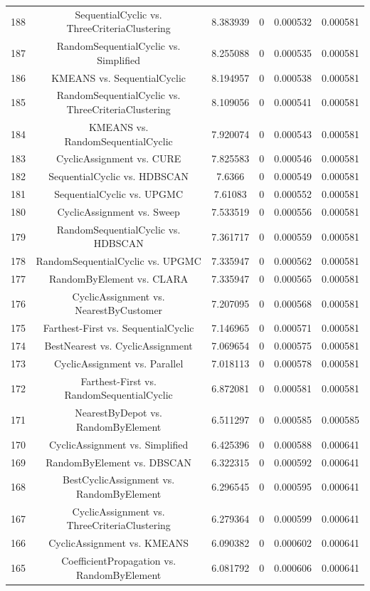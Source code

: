 \documentclass[a4paper,10pt]{article}
\begin{document}
\begin{landscape}
\begin{table}[!htp]
\begin{tabular}{cccccc}
188&SequentialCyclic vs. ThreeCriteriaClustering&8.383939&0&0.000532&0.000581\\
187&RandomSequentialCyclic vs. Simplified&8.255088&0&0.000535&0.000581\\
186&KMEANS vs. SequentialCyclic&8.194957&0&0.000538&0.000581\\
185&RandomSequentialCyclic vs. ThreeCriteriaClustering&8.109056&0&0.000541&0.000581\\
184&KMEANS vs. RandomSequentialCyclic&7.920074&0&0.000543&0.000581\\
183&CyclicAssignment vs. CURE&7.825583&0&0.000546&0.000581\\
182&SequentialCyclic vs. HDBSCAN&7.6366&0&0.000549&0.000581\\
181&SequentialCyclic vs. UPGMC&7.61083&0&0.000552&0.000581\\
180&CyclicAssignment vs. Sweep&7.533519&0&0.000556&0.000581\\
179&RandomSequentialCyclic vs. HDBSCAN&7.361717&0&0.000559&0.000581\\
178&RandomSequentialCyclic vs. UPGMC&7.335947&0&0.000562&0.000581\\
177&RandomByElement vs. CLARA&7.335947&0&0.000565&0.000581\\
176&CyclicAssignment vs. NearestByCustomer&7.207095&0&0.000568&0.000581\\
175&Farthest-First vs. SequentialCyclic&7.146965&0&0.000571&0.000581\\
174&BestNearest vs. CyclicAssignment&7.069654&0&0.000575&0.000581\\
173&CyclicAssignment vs. Parallel&7.018113&0&0.000578&0.000581\\
172&Farthest-First vs. RandomSequentialCyclic&6.872081&0&0.000581&0.000581\\
171&NearestByDepot vs. RandomByElement&6.511297&0&0.000585&0.000585\\
170&CyclicAssignment vs. Simplified&6.425396&0&0.000588&0.000641\\
169&RandomByElement vs. DBSCAN&6.322315&0&0.000592&0.000641\\
168&BestCyclicAssignment vs. RandomByElement&6.296545&0&0.000595&0.000641\\
167&CyclicAssignment vs. ThreeCriteriaClustering&6.279364&0&0.000599&0.000641\\
166&CyclicAssignment vs. KMEANS&6.090382&0&0.000602&0.000641\\
165&CoefficientPropagation vs. RandomByElement&6.081792&0&0.000606&0.000641\\

\end{tabular}
\end{table}
\end{landscape}
\end{document}
